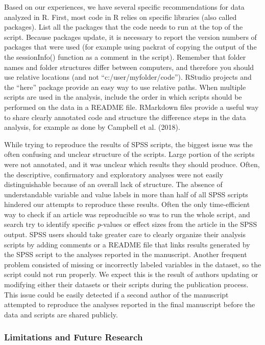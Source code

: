 \documentclass[,jou, a4paper,floatsintext]{apa6}
\begin{document}
Based on our experiences, we have several specific recommendations for data analyzed in R. First, most code in R relies on specific libraries (also called packages). List all the packages that the code needs to run at the top of the script. Because packages update, it is necessary to report the version numbers of packages that were used (for example using packrat of copying the output of the the sessionInfo() function as a comment in the script). Remember that folder names and folder structures differ between computers, and therefore you should use relative locations (and not \enquote{c:/user/myfolder/code}). RStudio projects and the \enquote{here} package provide an easy way to use relative paths. When multiple scripts are used in the analysis, include the order in which scripts should be performed on the data in a README file. RMarkdown files provide a useful way to share clearly annotated code and structure the difference steps in the data analysis, for example as done by Campbell et al. (2018).

While trying to reproduce the results of SPSS scripts, the biggest issue was the often confusing and unclear structure of the scripts. Large portion of the scripts were not annotated, and it was unclear which results they should produce. Often, the descriptive, confirmatory and exploratory analyses were not easily distinguishable because of an overall lack of structure. The absence of understandable variable and value labels in more than half of all SPSS scripts hindered our attempts to reproduce these results. Often the only time-efficient way to check if an article was reproducible so was to run the whole script, and search try to identify specific \emph{p}-values or effect sizes from the article in the SPSS output. SPSS users should take greater care to clearly organize their analysis scripts by adding comments or a README file that links results generated by the SPSS script to the analyses reported in the manuscript. Another frequent problem consisted of missing or incorrectly labeled variables in the dataset, so the script could not run properly. We expect this is the result of authors updating or modifying either their datasets or their scripts during the publication process. This issue could be easily detected if a second author of the manuscript attempted to reproduce the analyses reported in the final manuscript before the data and scripts are shared publicly.

\hypertarget{limitations-and-future-research}{%
\subsubsection{Limitations and Future Research}\label{limitations-and-future-research}}
\end{document}
